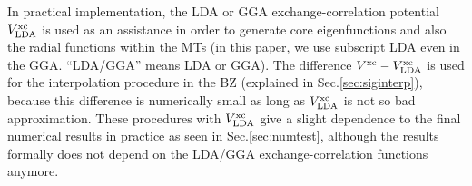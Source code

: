 \documentclass[twocolumn,showpacs,preprintnumbers,amsmath,amssymb,floatfix]{revtex4-1}
\def\vxc{V^{\rm xc}}
\begin{document}
In practical implementation, the LDA or GGA exchange-correlation
potential $V^{\rm xc}_{\rm LDA}$ 
is used as an assistance in order to generate core
eigenfunctions and also the radial functions within the MTs
(in this paper, we use subscript LDA even in the GGA. ``LDA/GGA'' means LDA or GGA).
The difference $\vxc-V^{\rm xc}_{\rm LDA}$ is used 
for the interpolation procedure in the BZ (explained in Sec.\ref{sec:siginterp}),
because this difference is numerically small 
as long as $V^{\rm xc}_{\rm LDA}$ is not so bad approximation.
These procedures with $V^{\rm xc}_{\rm LDA}$ give a slight dependence to
the final numerical results in practice as seen in Sec.\ref{sec:numtest},
although the results formally does not depend on the LDA/GGA exchange-correlation functions anymore.
\end{document}
